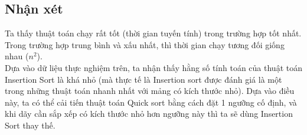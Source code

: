 \documentclass{article}
\begin{document}
\subsection{Nhận xét}
Ta thấy thuật toán chạy rất tốt (thời gian tuyến tính) trong trường hợp tốt nhất.\\
Trong trường hợp trung bình và xấu nhất, thì thời gian chạy tương đối giống nhau ($n^2$).\\
Dựa vào dữ liệu thực nghiệm trên, ta nhận thấy hằng số tính toán của thuật toán Insertion Sort là khá nhỏ (mà thực tế là Insertion sort được đánh giá là một trong những thuật toán nhanh nhất với mảng có kích thước nhỏ). Dựa vào điều này, ta có thể cải tiến thuật toán Quick sort bằng cách đặt 1 ngưỡng cố định, và khi dãy cần sắp xếp có kích thước nhỏ hơn ngưỡng này thì ta sẽ dùng Insertion Sort thay thế.
\end{document}

